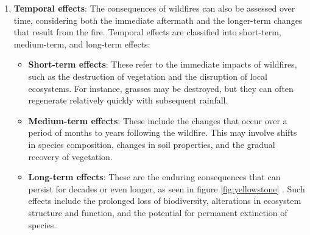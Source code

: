 \documentclass[
  12 pt,
]{Nemilov}
\providecommand{\tightlist}{%
  \setlength{\itemsep}{0pt}\setlength{\parskip}{0pt}}
\begin{document}
\begin{enumerate}
\def\labelenumi{\alph{enumi}.}
\setcounter{enumi}{1}
\tightlist
\item
  \textbf{Temporal effects}: The consequences of wildfires can also be assessed over time, considering both the immediate aftermath and the longer-term changes that result from the fire. Temporal effects are classified into short-term, medium-term, and long-term effects:

  \begin{itemize}
  \tightlist
  \item
    \textbf{Short-term effects}: These refer to the immediate impacts of wildfires, such as the destruction of vegetation and the disruption of local ecosystems. For instance, grasses may be destroyed, but they can often regenerate relatively quickly with subsequent rainfall.
  \item
    \textbf{Medium-term effects}: These include the changes that occur over a period of months to years following the wildfire. This may involve shifts in species composition, changes in soil properties, and the gradual recovery of vegetation.
  \item
    \textbf{Long-term effects}: These are the enduring consequences that can persist for decades or even longer, as seen in figure \ref{fig:yellowstone} \citep{nasa-yellowstone}. Such effects include the prolonged loss of biodiversity, alterations in ecosystem structure and function, and the potential for permanent extinction of species.
  \end{itemize}
\end{enumerate}
\end{document}
